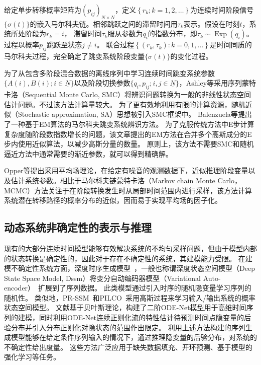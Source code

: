 给定单步转移概率矩阵为$\left(p_{i j}\right)_{N \times N}$，定义$\left\{r_k ; k=1,2, \ldots\right\}$为连续时间阶段信号$\{\sigma(t)\}$的嵌入马尔科夫链。相邻跳跃之间的滞留时间用$\tau_k$表示。假设在时刻$t$，系统所处阶段为$r_k=i$，
滞留时间$\tau _k$服从参数为$q_i$的指数分布，即$\tau_k\sim \operatorname{Exp}(q_i)$。
过程以概率$p_{ij}$跳跃至状态$j\neq i$。
联合过程$\left\{\left(r_k, \tau_k\right): k=0,1, \ldots\right\}$是时间同质的马尔科夫过程，完全确定了跳变系统阶段变量$\{\sigma(t)\}$的变化过程。



为了从包含多阶段混合数据的离线序列中学习连续时间跳变系统参数$\{A(i),B(i);i \in \underline{N}\}$以及阶段切换参数$\{q_i,p_{ij};i,j \in \underline{N}\}$，Ashley等采用序列蒙特卡洛（Sequential Monte Carlo, SMC）\cite{ashley2014sequential}将辨识问题转换为一般的非线性状态空间估计问题。不过该方法计算量较大。
为了更有效地利用有限的计算资源，随机近似（Stochastic approximation, SA）\cite{svensson2014identification,opper2007variational}思想被引入SMC框架中。
Balenzuela等提出了一种基于EM算法的马尔科夫跳变系统辨识方法\cite{balenzuela2022parameter}。
为了克服传统方法中E步计算复杂度随阶段数指数增长的问题，该文章提出的EM方法在合并多个高斯成分的E步内使用近似算法，以减少高斯分量的数量。
原则上，该方法不需要SMC和随机逼近方法中通常需要的渐近参数，就可以得到精确解。

Opper等\cite{opper2007variational}提出采用平均场理论，在给定有噪音的观测数据下，近似推理阶段变量以及估计系统参数。相比于马尔科夫链蒙特卡洛（Markov chain Monte Carlo， MCMC）方法关注于在阶段转换发生时从局部时间范围内进行采样，该方法计算系统潜在转移路径的概率分布的近似，因而易于实现平均场的因子化。

\subsection{动态系统非确定性的表示与推理}
现有的大部分连续时间模型能够有效解决系统的不均匀采样问题，但由于模型内部的状态转换是确定性的，因此对于存在不确定性的系统，其建模能力受限。
在建模不确定性系统方面，深度时序生成模型~\cite{Fraccaro2016,Chung2015,Karl2017}，一般也称谓深度状态空间模型（Deep State Space Model, Dssm）将变分自动编码器模型（Variational Auto-encoder）~\cite{kingma2013auto}扩展到了序列数据。
此类模型通过引入时序的随机隐变量学习序列的随机性。
类似地，PR-SSM~\cite{doerr2018probabilistic}和PILCO~\cite{deisenroth2011pilco}采用高斯过程来学习输入/输出系统的概率状态空间模型。
文献\cite{Yildiz2019}基于贝叶斯理论，构建了二阶ODE-Net模型用于高维时间序列的建模，同时利用ODE-Net连续正则化流的特性估计待预测时间点隐变量的后验分布并引入分布正则化对隐状态的范围作出限定。
利用上述方法构建的序列生成模型能够在给定条件序列输入的情况下，通过推理隐变量的后验分布，对系统的不确定性给出度量。
这些方法广泛应用于缺失数据填充\cite{Fraccaro2017}、开环预测\cite{Hafner2019}、基于模型的强化学习等任务\cite{Hafner2019}。

